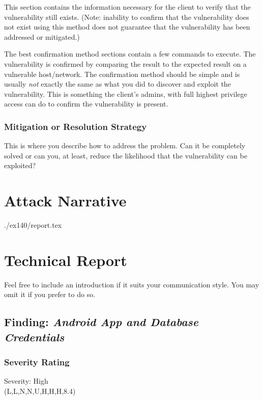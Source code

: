 		This section contains the information necessary for the
		client to verify that the vulnerability still exists.
		(Note: inability to confirm that the vulnerability
		does not exist using this method does not
		guarantee that the vulnerability has been addressed
		or mitigated.)
		
		The best confirmation method sections contain a few commands
		to execute. The vulnerability is confirmed by comparing
		the result to the expected result on a vulnerable
		host/network. The confirmation method should be simple
		and is usually \emph{not} exactly the same as what you
		did to discover and exploit the vulnerability.
		This is something the client's admins, with full
		highest privilege access can do to confirm the
		vulnerability is present.
		
    \subsubsection*{Mitigation or Resolution Strategy}
    
    	This is where you describe how to address the problem.
    	Can it be completely solved or can you, at least, reduce the
    	likelihood that the vulnerability can be exploited?
		



\section{Attack Narrative}
./ex140/report.tex

\section{Technical Report}

Feel free to include an introduction if it suits your communication style.
You may omit it if you prefer to do so.


  \subsection{Finding: \emph{Android App and Database Credentials}}
  
	\subsubsection*{Severity Rating}
        Severity: High \\	   	
		\cvss(L,L,N,N,U,H,H,H,8.4)
		
